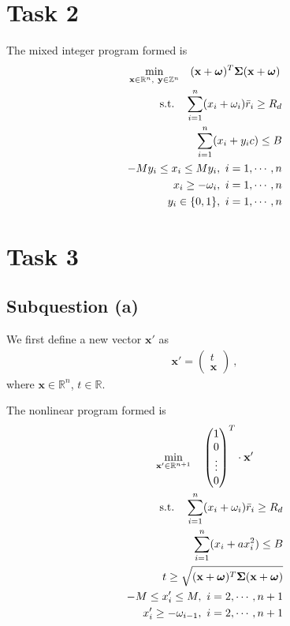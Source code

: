 \documentclass[12pt]{ftec2101}
\newcommand{\vect}[1]{\mathbf{#1}}
\begin{document}
\section{Task 2}
The mixed integer program formed is
\begin{gather}
    \min_{\vect{x}\in\mathbb{R}^n ,\  \vect{y}\in \mathbb{Z}^n} \quad (\vect{x}+\boldsymbol{\omega})^T \boldsymbol{\Sigma} (\vect{x}+\boldsymbol{\omega}) \\
    \label{mix:integer}
    \begin{aligned}
    \textup{s.t.} \quad \sum_{i=1}^{n} (x_i+\omega_i)\bar{r}_i \geq R_d\\
                \sum_{i=1}^{n} (x_i+y_i c) \leq B\\
                -M y_i \leq x_i \leq M y_i,\ i=1,\cdots,n\\
                x_i \geq -\omega_i,\ i = 1,\cdots,n\\
                y_i \in \{0,1\},\ i = 1,\cdots,n
\end{aligned}
\end{gather}
\section{Task 3}
\subsection{Subquestion (a)}
We first define a new vector $\vect{x'}$ as
\begin{align*}
    \vect{x'} = 
    \begin{pmatrix}
        t \\
        \vect{x}
    \end{pmatrix}\ , 
\end{align*}
where $\vect{x} \in \mathbb{R}^n$, $t \in \mathbb{R}$.

\noindent
The nonlinear program formed is 
\begin{gather}
    \min_{\vect{x'} \in \mathbb{R}^{n+1}} \quad
    \begin{pmatrix}
        1 \\
        0 \\
        \vdots \\
        0
    \end{pmatrix}^T
    \cdot \vect{x'}\\
\begin{aligned}
    \textup{s.t.} \quad \sum_{i=1}^{n} (x_i + \omega_i)\bar{r}_i \geq R_d \\
                        \sum_{i=1}^{n} (x_i + a x_i^2) \leq B \\
                        t \geq \sqrt{(\vect{x}+\boldsymbol{\omega})^T \boldsymbol{\Sigma} (\vect{x}+\boldsymbol{\omega})} \\
                        -M \leq x'_i \leq M,\ i=2,\cdots,n+1 \\
                        x'_i \geq - \omega_{i - 1},\ i=2,\cdots,n+1
\end{aligned}
\label{nonlinear:constraint}
\end{gather}
\end{document}
